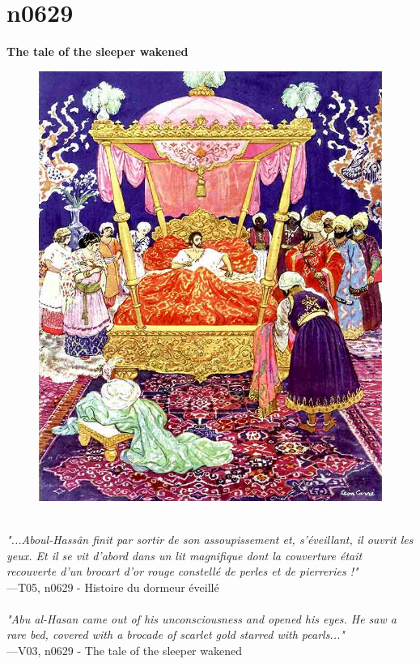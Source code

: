 \documentclass[../Carre_nights.tex]{subfiles}
\begin{document}
\newpage

\section{n0629}
\textbf{\Large{The tale of the sleeper wakened}} \\

\begin{figure}[ht]
\centering
\includegraphics[height=\figsize]{illustrations/volume_5/T05, n0629 - Histoire du dormeur éveillé.jpg}
\end{figure}

\textit{\\
"...Aboul-Hassân finit par sortir de son assoupissement et, s’éveillant, il ouvrit les yeux. Et il se vit d’abord dans un lit magnifique dont la couverture était recouverte d’un brocart d’or rouge constellé de perles et de pierreries !"} \\
—T05, n0629 - Histoire du dormeur éveillé \\~\\
\textit{"Abu al-Hasan came out of his unconsciousness and opened his eyes. He saw a rare bed, covered with a brocade of scarlet gold starred with pearls..."} \\
—V03, n0629 - The tale of the sleeper wakened
\end{document}
